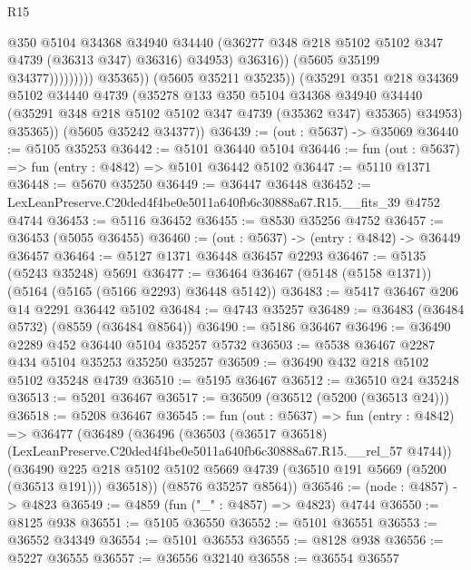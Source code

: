 \begin{lexlean}{R15}
\begin{coremodule}
{{{{{{{{{{{                                    @350
                                    @5104
                                    @34368
                                    @34940
                                    @34440
                                    (@36277 @348 @218 @5102 @5102 @347 @4739 (@36313 @347) @36316)
                                    @34953)
                                  @36316))
                              (@5605 @35199 @34377)))))))))
              @35365))
          (@5605 @35211 @35235))
        (@35291
          @351
          @218
          @34369
          @5102
          @34440
          @4739
          (@35278
            @133
            @350
            @5104
            @34368
            @34940
            @34440
            (@35291 @348 @218 @5102 @5102 @347 @4739 (@35362 @347) @35365)
            @34953)
          @35365))
      (@5605 @35242 @34377))
@36439 := (out : @5637) -> @35069
@36440 := @5105 @35253
@36442 := @5101 @36440 @5104
@36446 := fun (out : @5637) => fun (entry : @4842) => @5101 @36442 @5102
@36447 := @5110 @1371
@36448 := @5670 @35250
@36449 := @36447 @36448
@36452 := LexLeanPreserve.C20ded4f4be0e5011a640fb6c30888a67.R15.__fits_39 @4752 @4744
@36453 := @5116 @36452
@36455 := @8530 @35256 @4752
@36457 := @36453 (@5055 @36455)
@36460 := (out : @5637) -> (entry : @4842) -> @36449 @36457
@36464 := @5127 @1371 @36448 @36457 @2293
@36467 := @5135 (@5243 @35248) @5691
@36477 := @36464 @36467 (@5148 (@5158 @1371)) (@5164 (@5165 (@5166 @2293) @36448 @5142))
@36483 := @5417 @36467 @206 @14 @2291 @36442 @5102
@36484 := @4743 @35257
@36489 := @36483 (@36484 @5732) (@8559 (@36484 @8564))
@36490 := @5186 @36467
@36496 := @36490 @2289 @452 @36440 @5104 @35257 @5732
@36503 := @5538 @36467 @2287 @434 @5104 @35253 @35250 @35257
@36509 := @36490 @432 @218 @5102 @5102 @35248 @4739
@36510 := @5195 @36467
@36512 := @36510 @24 @35248
@36513 := @5201 @36467
@36517 := @36509 (@36512 (@5200 (@36513 @24)))
@36518 := @5208 @36467
@36545 := fun (out : @5637) =>
  fun (entry : @4842) =>
  @36477
    (@36489
      (@36496
        (@36503
          (@36517 @36518)
          (LexLeanPreserve.C20ded4f4be0e5011a640fb6c30888a67.R15.__rel_57 @4744))
        (@36490 @225 @218 @5102 @5102 @5669 @4739 (@36510 @191 @5669 (@5200 (@36513 @191))) @36518))
      (@8576 @35257 @8564))
@36546 := (node : @4857) -> @4823
@36549 := @4859 (fun ("_" : @4857) => @4823) @4744
@36550 := @8125 @938
@36551 := @5105 @36550
@36552 := @5101 @36551
@36553 := @36552 @34349
@36554 := @5101 @36553
@36555 := @8128 @938
@36556 := @5227 @36555
@36557 := @36556 @32140
@36558 := @36554 @36557
}}}}}}}}}}}
\end{coremodule}
\end{lexlean}
